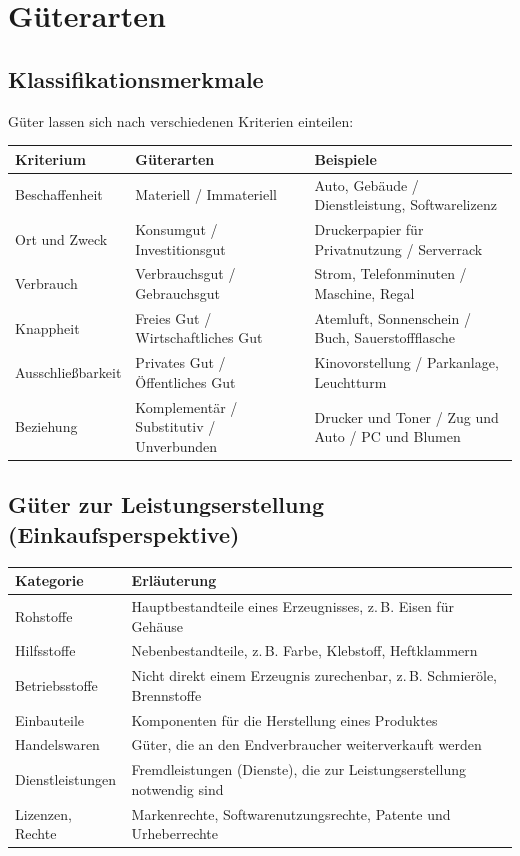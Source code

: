\documentclass[11pt, a4paper]{article}
\begin{document}
\section{Güterarten}

\subsection{Klassifikationsmerkmale}

Güter lassen sich nach verschiedenen Kriterien einteilen:

\begin{center}
\begin{tabular}{p{3cm} p{4.5cm} p{5.5cm}}
\toprule
\textbf{Kriterium} & \textbf{Güterarten} & \textbf{Beispiele}\\
\midrule
Beschaffenheit & Materiell / Immateriell & Auto, Gebäude / Dienstleistung, Softwarelizenz\\
\addlinespace
Ort und Zweck & Konsumgut / Investitionsgut & Druckerpapier für Privatnutzung / Serverrack\\
\addlinespace
Verbrauch & Verbrauchsgut / Gebrauchsgut & Strom, Telefonminuten / Maschine, Regal\\
\addlinespace
Knappheit & Freies Gut / Wirtschaftliches Gut & Atemluft, Sonnenschein / Buch, Sauerstoff\-flasche\\
\addlinespace
Ausschließbarkeit & Privates Gut / Öffentliches Gut & Kinovorstellung / Parkanlage, Leuchtturm\\
\addlinespace
Beziehung & Komplementär / Substitutiv / Unverbunden & Drucker und Toner / Zug und Auto / PC und Blumen\\
\bottomrule
\end{tabular}
\end{center}

\subsection{Güter zur Leistungserstellung (Einkaufsperspektive)}

\begin{center}
\begin{tabular}{p{3cm} p{10cm}}
\toprule
\textbf{Kategorie} & \textbf{Erläuterung}\\
\midrule
Rohstoffe & Hauptbestandteile eines Erzeugnisses, z.\,B. Eisen für Gehäuse\\
Hilfsstoffe & Nebenbestandteile, z.\,B. Farbe, Klebstoff, Heftklammern\\
Betriebsstoffe & Nicht direkt einem Erzeugnis zurechenbar, z.\,B. Schmieröle, Brennstoffe\\
Einbauteile & Komponenten für die Herstellung eines Produktes\\
Handelswaren & Güter, die an den Endverbraucher weiterverkauft werden\\
Dienstleistungen & Fremdleistungen (Dienste), die zur Leistungserstellung notwendig sind\\
Lizenzen, Rechte & Markenrechte, Softwarenutzungsrechte, Patente und Urheberrechte\\
\bottomrule
\end{tabular}
\end{center}
\end{document}
